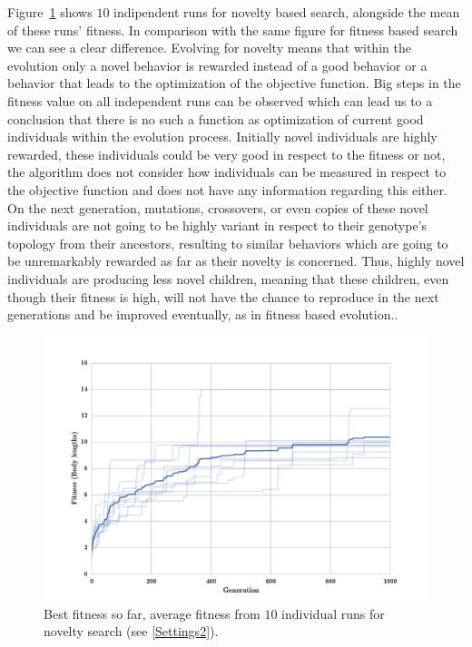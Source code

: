 Figure~\ref{fig:indRunnAvgSize10Novelty} shows $10$ indipendent runs for novelty based search, alongside the mean of these runs' fitness. In comparison with the same figure for fitness based search we can see a clear difference. Evolving for novelty means that within the evolution only a novel behavior is rewarded instead of a good behavior or a behavior that leads to the optimization of the objective function. Big steps in the fitness value on all independent runs can be observed which can lead us to a conclusion that there is no such a function as optimization of current good individuals within the evolution process. Initially novel individuals are highly rewarded, these individuals could be very good in respect to the fitness or not, the algorithm does not consider how individuals can be measured in respect to the objective function and does not have any information regarding this either. On the next generation, mutations, crossovers, or even copies of these novel individuals are not going to be highly variant in respect to their genotype's topology from their ancestors, resulting to similar behaviors which are going to be unremarkably rewarded as far as their novelty is concerned. Thus, highly novel individuals are producing less novel children, meaning that these children, even though their fitness is high, will not have the chance to reproduce in the next generations and be improved eventually, as in fitness based evolution..

\begin{figure}[h!]
\centering
\includegraphics[width=1.0\textwidth]{../Figures/Results/indRunnAvgSize10Novelty.pdf}
\caption{Best fitness so far, average fitness from $10$ individual runs for novelty search (see \ref{Settings2}).}
\label{fig:indRunnAvgSize10Novelty}
\end{figure}


